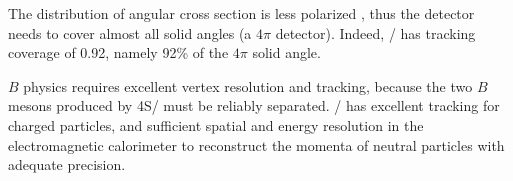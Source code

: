 The distribution of angular cross section is less
polarized \cite{Boutigny:1995ib,McGregor:2008ek}, thus the detector needs to
cover almost all solid angles (a $4\pi$ detector).
Indeed, \BaBar/ has tracking coverage of 0.92, namely 92\% of the $4\pi$ solid
angle.

$B$ physics requires excellent vertex resolution and tracking, because the two
$B$ mesons produced by \Y4S/ must be reliably separated.
\BaBar/ has excellent tracking for charged particles, and sufficient spatial
and energy resolution in the electromagnetic calorimeter to reconstruct the momenta of neutral
particles \cite{Bauer:2005} with adequate precision.